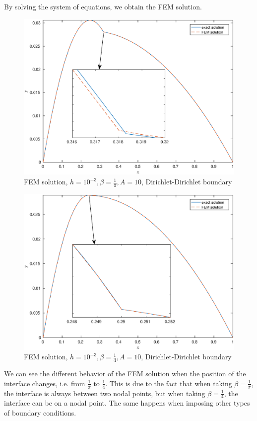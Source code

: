 \documentclass[12pt]{article}
\begin{document}
By solving the system of equations, we obtain the FEM solution.
\begin{figure}[h!]
\centering
\includegraphics[scale=0.6]{FEM-pi-DD}
\caption{FEM solution, $h=10^{-3},\beta=\frac{1}{\pi},A=10$, Dirichlet-Dirichlet boundary}
\end{figure}
\pagebreak
\begin{figure}[h!]
\centering
\includegraphics[scale=0.6]{FEM-4-DD}
\caption{FEM solution, $h=10^{-3},\beta=\frac{1}{4},A=10$, Dirichlet-Dirichlet boundary}
\end{figure}

We can see the different behavior of the FEM solution when the position of the interface changes, i.e. from $\frac{1}{\pi}$ to $\frac{1}{4}$. This is due to the fact that when taking $\beta=\frac{1}{\pi}$, the interface is always between two nodal points, but when taking $\beta=\frac{1}{4}$, the interface can be on a nodal point. The same happens when imposing other types of boundary conditions.
\end{document}
